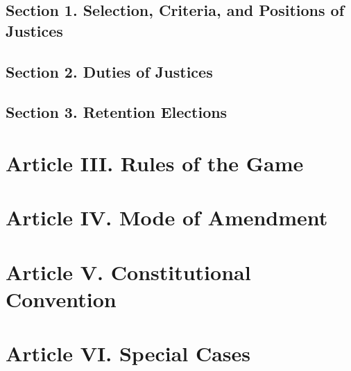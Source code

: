 \documentclass{article}
\begin{document}
	\subsection*{Section 1. Selection, Criteria, and Positions of Justices}
	\subsection*{Section 2. Duties of Justices}
	\subsection*{Section 3. Retention Elections}
\section{Article III. Rules of the Game}

\section{Article IV. Mode of Amendment}

\section{Article V. Constitutional Convention}

\section{Article VI. Special Cases}	
\end{document}
